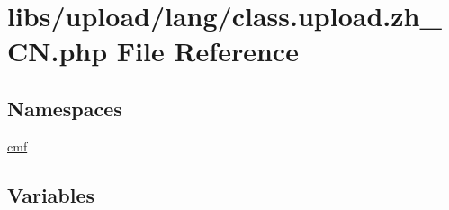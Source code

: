 \hypertarget{class_8upload_8zh___c_n_8php}{}\section{libs/upload/lang/class.upload.\+zh\+\_\+\+C\+N.\+php File Reference}
\label{class_8upload_8zh___c_n_8php}
\subsection*{Namespaces}
\begin{DoxyCompactItemize}
\item 
 \hyperlink{namespacecmf}{cmf}
\end{DoxyCompactItemize}
\subsection*{Variables}
